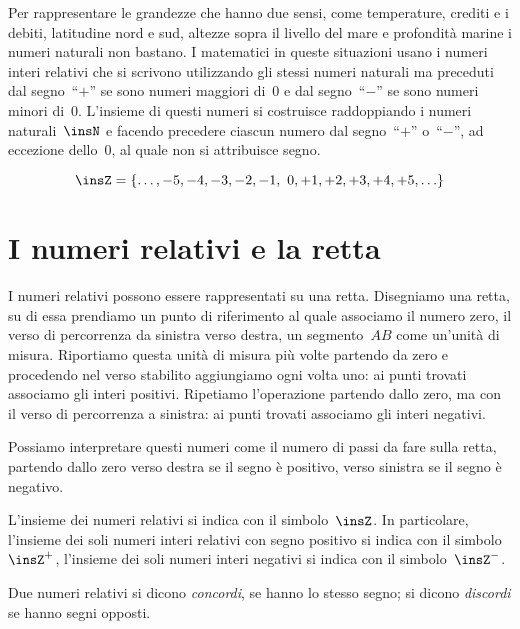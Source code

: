 Per rappresentare le grandezze che hanno due sensi, come temperature, crediti e 
i debiti, latitudine nord e sud,
altezze sopra il livello del mare e profondità marine i numeri naturali non 
bastano. I matematici in queste
situazioni usano i numeri interi relativi che si scrivono utilizzando gli stessi 
numeri naturali ma preceduti
dal segno~``\(+\)'' se sono numeri maggiori di~0 e dal segno~``\(-\)'' se sono 
numeri minori di~0. L'insieme di questi numeri
si costruisce raddoppiando i numeri naturali~\(\insN\) e facendo precedere ciascun 
numero dal segno~``\(+\)'' o~``\(-\)'',
ad eccezione dello~0, al quale non si attribuisce segno.

\[ \insZ=\lbrace\ldots,-5, -4, -3, -2, -1,~0, +1, +2, +3, +4, +5, \ldots\rbrace 
\]
\newpage

\section{I numeri relativi e la retta}
\label{sec:02_retta}

I numeri relativi possono essere rappresentati su una retta. Disegniamo una 
retta, su di essa prendiamo
un punto di riferimento al quale associamo il numero zero, il verso di 
percorrenza da sinistra verso destra,
un segmento~\(AB\) come un'unità di misura. Riportiamo questa unità di misura più 
volte partendo da zero e
procedendo nel verso stabilito aggiungiamo ogni volta uno: ai punti trovati 
associamo gli interi positivi.
Ripetiamo l'operazione partendo dallo zero, ma con il verso di percorrenza a 
sinistra: ai punti trovati associamo
gli interi negativi.

\begin{center}
 
\end{center}

Possiamo interpretare questi numeri come il numero di passi da fare sulla retta, 
partendo dallo zero verso
destra se il segno è positivo, verso sinistra se il segno è negativo.

L'insieme dei numeri relativi si indica con il simbolo~\(\insZ\). In particolare, 
l'insieme dei soli numeri interi relativi
con segno positivo si indica con il simbolo~\(\insZ^+\),
l'insieme dei soli numeri interi negativi si indica con il simbolo~\(\insZ^-\).

\begin{definizione}
 Due numeri relativi si dicono \emph{concordi}, se hanno lo stesso segno; si 
dicono \emph{discordi} se hanno
 segni opposti.
\end{definizione}

